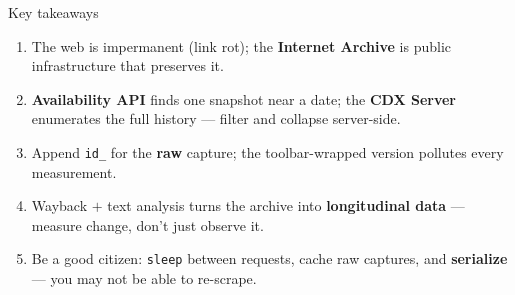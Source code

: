 \documentclass[9pt,aspectratio=169]{beamer}
\begin{document}
\begin{frame}{Key takeaways}
    \begin{enumerate}
        \item The web is impermanent (link rot); the \textbf{Internet Archive} is public infrastructure that preserves it.
        \item \textbf{Availability API} finds one snapshot near a date; the \textbf{CDX Server} enumerates the full history --- filter and collapse server-side.
        \item Append \texttt{id\_} for the \textbf{raw} capture; the toolbar-wrapped version pollutes every measurement.
        \item Wayback $+$ text analysis turns the archive into \textbf{longitudinal data} --- measure change, don't just observe it.
        \item Be a good citizen: \texttt{sleep} between requests, cache raw captures, and \textbf{serialize} --- you may not be able to re-scrape.
    \end{enumerate}
    \bigskip
\end{frame}
\end{document}
